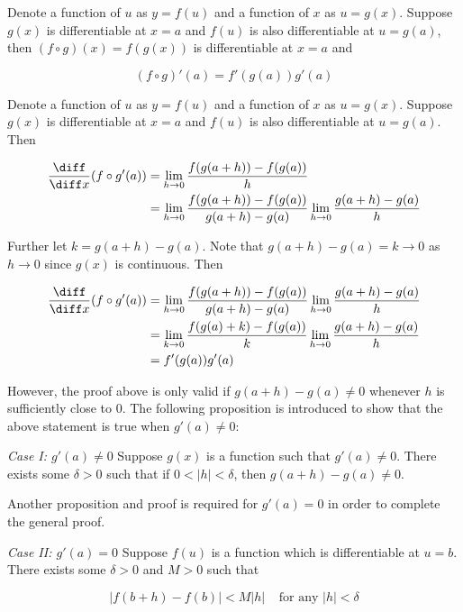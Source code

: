 \begin{thm}
  Denote a function of $u$ as $y=f(u)$ and a function of $x$ as $u=g(x)$. Suppose $g(x)$ is differentiable at $x=a$ and $f(u)$ is also differentiable at $u=g(a)$, then $(f\circ g)(x)=f(g(x))$ is differentiable at $x=a$ and

  $$(f\circ g)'(a)=f'(g(a))g'(a)$$\s

  \prf Denote a function of $u$ as $y=f(u)$ and a function of $x$ as $u=g(x)$. Suppose $g(x)$ is differentiable at $x=a$ and $f(u)$ is also differentiable at $u=g(a)$. Then

  $$\begin{aligned}[t]
    \frac{\diff }{\diff  x}(f\circ g'(a))&=\lim_{h\to 0}\frac{f(g(a+h))-f(g(a))}{h}\\
    &=\lim_{h\to 0}\frac{f(g(a+h))-f(g(a))}{g(a+h)-g(a)}\lim_{h\to 0}\frac{g(a+h)-g(a)}{h}
  \end{aligned}$$\s

  Further let $k=g(a+h)-g(a)$. Note that $g(a+h)-g(a)=k\to 0$ as $h\to 0$ since $g(x)$ is continuous. Then

  $$\begin{aligned}[t]
    \frac{\diff }{\diff  x}(f\circ g'(a))&=\lim_{h\to 0}\frac{f(g(a+h))-f(g(a))}{g(a+h)-g(a)}\lim_{h\to 0}\frac{g(a+h)-g(a)}{h}\\
    &=\lim_{k\to 0}\frac{f(g(a)+k)-f(g(a))}{k}\lim_{h\to 0}\frac{g(a+h)-g(a)}{h}\\
    &=f'(g(a))g'(a)
  \end{aligned}$$
\end{thm}

However, the proof above is only valid if $g(a+h)-g(a)\neq 0$ whenever $h$ is sufficiently close to $0$. The following proposition is introduced to show that the above statement is true when $g'(a)\neq 0$:\n

\begin{pst}
  {\color{zt}\textit{Case I: $g'(a)\neq 0$}} Suppose $g(x)$ is a function such that $g'(a)\neq 0$. There exists some $\delta>0$ such that if $0<\left| h\right| <\delta$, then $g(a+h)-g(a)\neq 0$.
\end{pst}\n

Another proposition and proof is required for $g'(a)=0$ in order to complete the general proof.\n

\begin{pst}
  {\color{zt}\textit{Case II: $g'(a)=0$}} Suppose $f(u)$ is a function which is differentiable at $u=b$. There exists some $\delta>0$ and $M>0$ such that

  $$\left| f(b+h)-f(b)\right| <M\left| h\right| \;\;\;\;\text{for any }\left| h\right| <\delta$$
\end{pst}\n

